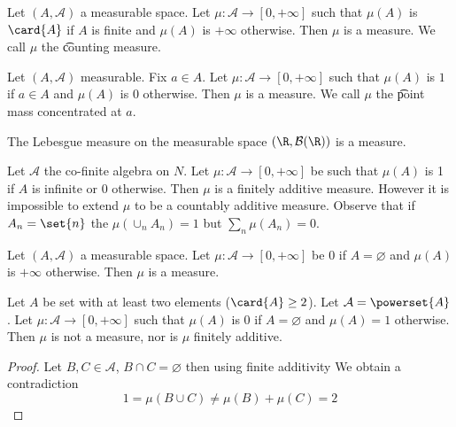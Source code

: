 \begin{example}
Let $(A, \mathcal{A} )$ a measurable space.
Let $\mu : \mathcal{A}  \to [0, +\infty]$ such that $\mu (A)$ is $\card{A}$ if $A$ is finite and $\mu (A)$ is $+\infty$ otherwise.
Then $\mu $ is a measure.
We call $\mu $ the \t{counting measure}.
\end{example}

\begin{example}
Let $(A, \mathcal{A} )$ measurable.
Fix $a \in A$.
Let $\mu : \mathcal{A}  \to [0, +\infty]$ such that $\mu (A)$ is $1$ if $a \in A$ and $\mu (A)$ is $0$ otherwise.
Then $\mu $ is a measure.
We call $\mu $ the \t{point mass} concentrated at $a$.
\end{example}

\begin{example}
The Lebesgue measure on the measurable space $(\R , \mathcal{B} (\R ))$ is a measure.
\end{example}

\begin{example}
Let $\mathcal{A} $ the co-finite algebra on $N$.
Let $\mu : \mathcal{A}  \to [0, +\infty]$ be such that $\mu (A)$ is 1 if $A$ is infinite or 0 otherwise.
Then $\mu $ is a finitely additive measure.
However it is impossible to extend $\mu $ to be a countably additive measure.
Observe that if $A_n = \set{n}$ the $\mu (\cup_{n} A_n) = 1$ but $\sum_{n} \mu (A_n) = 0$.
\end{example}

\begin{example}
Let $(A, \mathcal{A} )$ a measurable space.
Let $\mu : \mathcal{A}  \to [0, +\infty]$ be $0$ if $A = \varnothing$ and $\mu (A)$ is $+\infty$ otherwise.
Then $\mu $ is a measure.

\end{example}

\begin{example}
Let $A$ be set with at least two elements ($\card{A} \geq 2$).
Let $\mathcal{A}  = \powerset{A}$.
Let $\mu : \mathcal{A}  \to [0, +\infty]$ such that $\mu (A)$ is $0$ if $A = \varnothing$ and $\mu (A) = 1$ otherwise.
Then $\mu $ is not a measure, nor is $\mu $ finitely additive.
\begin{proof}Let $B, C \in \mathcal{A} $,
$B \cap  C = \varnothing$
then using finite additivity
We obtain a contradiction
\[
1 = \mu (B \cup C) \neq \mu (B) + \mu (C) = 2
\]\end{proof}
\end{example}

